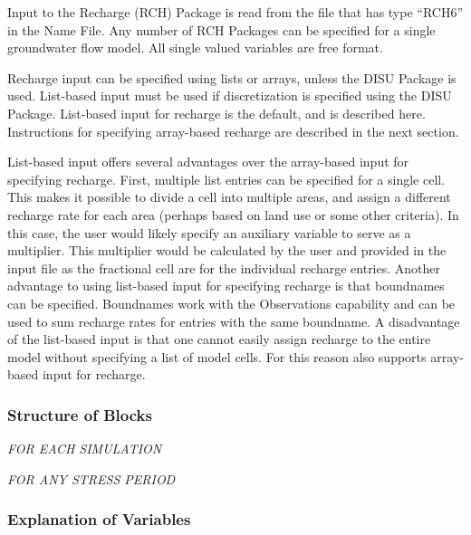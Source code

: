 
Input to the Recharge (RCH) Package is read from the file that has type ``RCH6'' in the Name File.  Any number of RCH Packages can be specified for a single groundwater flow model.  All single valued variables are free format. 

Recharge input can be specified using lists or arrays, unless the DISU Package is used.  List-based input must be used if discretization is specified using the DISU Package.  List-based input for recharge is the default, and is described here.  Instructions for specifying array-based recharge are described in the next section. 

List-based input offers several advantages over the array-based input for specifying recharge.  First, multiple list entries can be specified for a single cell.  This makes it possible to divide a cell into multiple areas, and assign a different recharge rate for each area (perhaps based on land use or some other criteria).  In this case, the user would likely specify an auxiliary variable to serve as a multiplier.  This multiplier would be calculated by the user and provided in the input file as the fractional cell are for the individual recharge entries.  Another advantage to using list-based input for specifying recharge is that boundnames can be specified.  Boundnames work with the Observations capability and can be used to sum recharge rates for entries with the same boundname.  A disadvantage of the list-based input is that one cannot easily assign recharge to the entire model without specifying a list of model cells.  For this reason \mf also supports array-based input for recharge.

\vspace{5mm}
\subsubsection{Structure of Blocks}
\vspace{5mm}

\noindent \textit{FOR EACH SIMULATION}


\vspace{5mm}
\noindent \textit{FOR ANY STRESS PERIOD}


\vspace{5mm}
\subsubsection{Explanation of Variables}
\begin{description}

\end{description}

